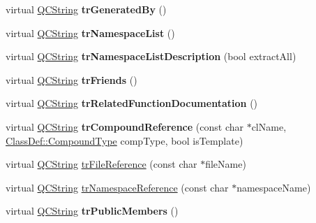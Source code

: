 \begin{DoxyCompactItemize}
\mbox{\label{class_translator_chinese_ad028674c90973d7d10a00c444af78a52}} 
virtual \mbox{\hyperlink{class_q_c_string}{Q\+C\+String}} {\bfseries tr\+Generated\+By} ()
\item 
\mbox{\label{class_translator_chinese_ace525b53c345fd89bd8a1db70cb16028}} 
virtual \mbox{\hyperlink{class_q_c_string}{Q\+C\+String}} {\bfseries tr\+Namespace\+List} ()
\item 
\mbox{\label{class_translator_chinese_ac82647ff9df0b0b3a9a31c41d4bba355}} 
virtual \mbox{\hyperlink{class_q_c_string}{Q\+C\+String}} {\bfseries tr\+Namespace\+List\+Description} (bool extract\+All)
\item 
\mbox{\label{class_translator_chinese_a7659036c35059e735b3c5812124817a2}} 
virtual \mbox{\hyperlink{class_q_c_string}{Q\+C\+String}} {\bfseries tr\+Friends} ()
\item 
\mbox{\label{class_translator_chinese_a0048d091174d7ecbc9835f56ec23bce9}} 
virtual \mbox{\hyperlink{class_q_c_string}{Q\+C\+String}} {\bfseries tr\+Related\+Function\+Documentation} ()
\item 
\mbox{\label{class_translator_chinese_aef6798320a9a5e0baa6b8a972255407c}} 
virtual \mbox{\hyperlink{class_q_c_string}{Q\+C\+String}} {\bfseries tr\+Compound\+Reference} (const char $\ast$cl\+Name, \mbox{\hyperlink{class_class_def_ae70cf86d35fe954a94c566fbcfc87939}{Class\+Def\+::\+Compound\+Type}} comp\+Type, bool is\+Template)
\item 
virtual \mbox{\hyperlink{class_q_c_string}{Q\+C\+String}} \mbox{\hyperlink{class_translator_chinese_ae401169f6585e9ffafd3ad5b55de58e2}{tr\+File\+Reference}} (const char $\ast$file\+Name)
\item 
virtual \mbox{\hyperlink{class_q_c_string}{Q\+C\+String}} \mbox{\hyperlink{class_translator_chinese_a3eb1d572493ec42ec5e807c237282d10}{tr\+Namespace\+Reference}} (const char $\ast$namespace\+Name)
\item 
\mbox{\label{class_translator_chinese_ac2cb3227928a98c5b1fae5ad481dadcb}} 
virtual \mbox{\hyperlink{class_q_c_string}{Q\+C\+String}} {\bfseries tr\+Public\+Members} ()

\end{DoxyCompactItemize}
